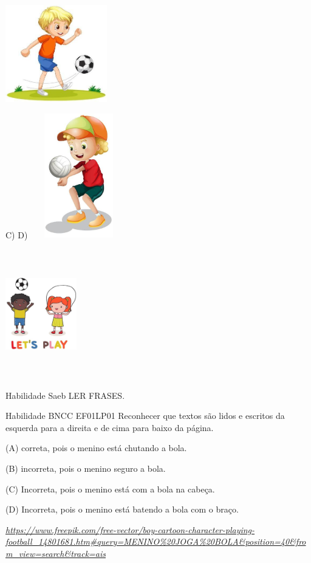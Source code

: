 \includegraphics[width=1.73760in,height=1.66822in]{media/image200.jpg}

C) D)
\includegraphics[width=1.65208in,height=2.13056in]{media/image201.jpg}

\includegraphics[width=1.21736in,height=2.20972in]{media/image202.jpg}

Habilidade Saeb LER FRASES.

Habilidade BNCC EF01LP01 Reconhecer que textos são lidos e escritos da
esquerda para a direita e de cima para baixo da página.

(A) correta, pois o menino está chutando a bola.

(B) incorreta, pois o menino seguro a bola.

(C) Incorreta, pois o menino está com a bola na cabeça.

(D) Incorreta, pois o menino está batendo a bola com o braço.

\href{https://www.freepik.com/free-vector/boy-cartoon-character-playing-football_14801681.htm\#query=MENINO\%20JOGA\%20BOLA\&position=40\&from_view=search\&track=ais}{\emph{https://www.freepik.com/free-vector/boy-cartoon-character-playing-football\_14801681.htm\#query=MENINO\%20JOGA\%20BOLA\&position=40\&from\_view=search\&track=ais}}

